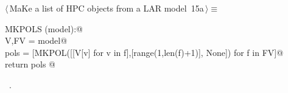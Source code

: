 \documentclass[11pt,oneside]{article}	%
\begin{document}
\begin{flushleft} \small
\begin{minipage}{\linewidth} \label{scrap30}
\protect{}$\langle\,$MaKe a list of HPC objects from a LAR model\nobreak\ {\footnotesize 15a}$\,\rangle\equiv$
\vspace{-1ex}
\begin{list}{}{} \item
\mbox{}\verb@def MKPOLS (model):@\\
\mbox{}\verb@    V,FV = model@\\
\mbox{}\verb@    pols = [MKPOL([[V[v] for v in f],[range(1,len(f)+1)], None]) for f in FV]@\\
\mbox{}\verb@    return pols  @\\
\mbox{}\verb@@{\NWsep}
\end{list}
\vspace{-1ex}
\footnotesize\addtolength{\baselineskip}{-1ex}
\begin{list}{}{\setlength{\itemsep}{-\parsep}\setlength{\itemindent}{-\leftmargin}}
\item \NWtxtMacroRefIn\ .
\end{list}
\end{minipage}\\[4ex]
\end{flushleft}
\end{document}
